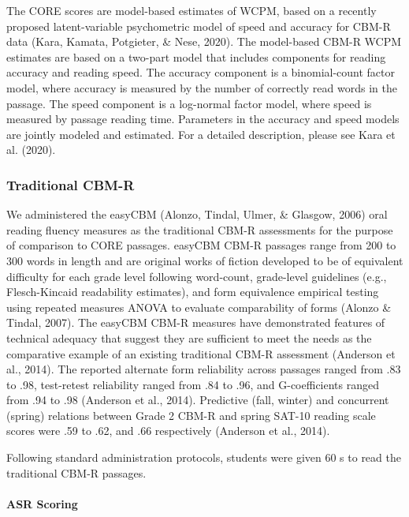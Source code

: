 \documentclass[
  english,
  man, fleqn, noextraspace]{apa6}
\let\oldparagraph\paragraph
\renewcommand{\paragraph}[1]{\oldparagraph{#1}\mbox{}}
\begin{document}
The CORE scores are model-based estimates of WCPM, based on a recently proposed latent-variable psychometric model of speed and accuracy for CBM-R data (Kara, Kamata, Potgieter, \& Nese, 2020). The model-based CBM-R WCPM estimates are based on a two-part model that includes components for reading accuracy and reading speed. The accuracy component is a binomial-count factor model, where accuracy is measured by the number of correctly read words in the passage. The speed component is a log-normal factor model, where speed is measured by passage reading time. Parameters in the accuracy and speed models are jointly modeled and estimated. For a detailed description, please see Kara et al. (2020).

\hypertarget{traditional-cbm-r}{%
\subsubsection{Traditional CBM-R}\label{traditional-cbm-r}}

We administered the easyCBM (Alonzo, Tindal, Ulmer, \& Glasgow, 2006) oral reading fluency measures as the traditional CBM-R assessments for the purpose of comparison to CORE passages. easyCBM CBM-R passages range from 200 to 300 words in length and are original works of fiction developed to be of equivalent difficulty for each grade level following word-count, grade-level guidelines (e.g., Flesch-Kincaid readability estimates), and form equivalence empirical testing using repeated measures ANOVA to evaluate comparability of forms (Alonzo \& Tindal, 2007). The easyCBM CBM-R measures have demonstrated features of technical adequacy that suggest they are sufficient to meet the needs as the comparative example of an existing traditional CBM-R assessment (Anderson et al., 2014). The reported alternate form reliability across passages ranged from .83 to .98, test-retest reliability ranged from .84 to .96, and G-coefficients ranged from .94 to .98 (Anderson et al., 2014). Predictive (fall, winter) and concurrent (spring) relations between Grade 2 CBM-R and spring SAT-10 reading scale scores were .59 to .62, and .66 respectively (Anderson et al., 2014).

Following standard administration protocols, students were given 60 s to read the traditional CBM-R passages.

\hypertarget{asr-scoring}{%
\paragraph{ASR Scoring}\label{asr-scoring}}
\end{document}
